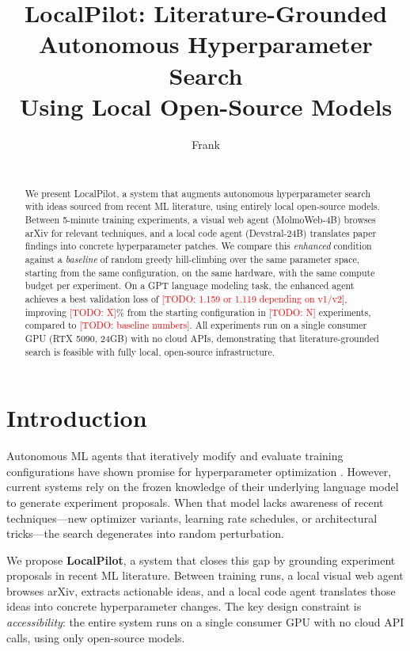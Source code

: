 \documentclass[11pt]{article}
\title{LocalPilot: Literature-Grounded Autonomous Hyperparameter Search\\Using Local Open-Source Models}
\author{
  Frank \todo{full name} \\
  \todo{affiliation} \\
  \texttt{\todo{email}}
}
\date{}
\newcommand{\todo}[1]{\textcolor{red}{[TODO: #1]}}
\begin{document}
\maketitle

\begin{abstract}
We present LocalPilot, a system that augments autonomous hyperparameter
search with ideas sourced from recent ML literature, using entirely local
open-source models. Between 5-minute training experiments, a visual web
agent (MolmoWeb-4B) browses arXiv for relevant techniques, and a local
code agent (Devstral-24B) translates paper findings into concrete
hyperparameter patches. We compare this \emph{enhanced} condition against
a \emph{baseline} of random greedy hill-climbing over the same parameter
space, starting from the same configuration, on the same hardware, with
the same compute budget per experiment. On a GPT language modeling task,
the enhanced agent achieves a best validation loss of \todo{1.159 or
1.119 depending on v1/v2}, improving \todo{X}\% from the starting
configuration in \todo{N} experiments, compared to \todo{baseline
numbers}. All experiments run on a single consumer GPU (RTX 5090, 24GB)
with no cloud APIs, demonstrating that literature-grounded search is
feasible with fully local, open-source infrastructure.
\end{abstract}


\section{Introduction}
\label{sec:intro}

Autonomous ML agents that iteratively modify and evaluate training
configurations have shown promise for hyperparameter optimization
\citep{lu2024aiscientist}. However, current systems rely on the frozen
knowledge of their underlying language model to generate experiment
proposals. When that model lacks awareness of recent techniques---new
optimizer variants, learning rate schedules, or architectural
tricks---the search degenerates into random perturbation.

We propose \textbf{LocalPilot}, a system that closes this gap by
grounding experiment proposals in recent ML literature. Between training
runs, a local visual web agent browses arXiv, extracts actionable ideas,
and a local code agent translates those ideas into concrete
hyperparameter changes. The key design constraint is
\emph{accessibility}: the entire system runs on a single consumer GPU
with no cloud API calls, using only open-source models.
\end{document}
